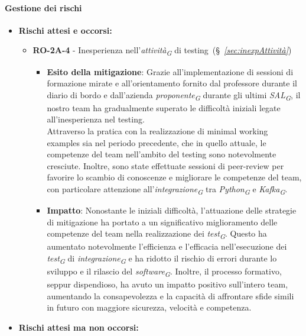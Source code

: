 \paragraph{Gestione dei rischi}

\begin{itemize}
    \item \textbf{Rischi attesi e occorsi:}
    \begin{itemize}
        \item \textbf{RO-2A-4} - Inesperienza nell'\textit{attività}\textsubscript{\textit{G}} di testing~(\S~\textit{\ref{sec:inexpAttività}})
        \begin{itemize}
            \item \textbf{Esito della mitigazione}: Grazie all'implementazione di sessioni di formazione mirate e all'orientamento fornito dal professore durante il diario di bordo e dall'azienda \textit{proponente}\textsubscript{\textit{G}} durante gli ultimi \textit{SAL}\textsubscript{\textit{G}}, il nostro team ha gradualmente superato le difficoltà iniziali legate all'inesperienza nel testing. \\
            Attraverso la pratica con la realizzazione di minimal working examples sia nel periodo precedente, che in quello attuale, le competenze del team nell'ambito del testing sono notevolmente cresciute. Inoltre, sono state effettuate sessioni di peer-review per favorire lo scambio di conoscenze e migliorare le competenze del team, con particolare attenzione all'\textit{integrazione}\textsubscript{\textit{G}} tra \textit{Python}\textsubscript{\textit{G}} e \textit{Kafka}\textsubscript{\textit{G}}.
            \item \textbf{Impatto}: Nonostante le iniziali difficoltà, l'attuazione delle strategie di mitigazione ha portato a un significativo miglioramento delle competenze del team nella realizzazione dei \textit{test}\textsubscript{\textit{G}}. Questo ha aumentato notevolmente l'efficienza e l'efficacia nell'esecuzione dei \textit{test}\textsubscript{\textit{G}} di \textit{integrazione}\textsubscript{\textit{G}} e ha ridotto il rischio di errori durante lo sviluppo e il rilascio del \textit{software}\textsubscript{\textit{G}}. Inoltre, il processo formativo, seppur dispendioso, ha avuto un impatto positivo sull'intero team, aumentando la consapevolezza e la capacità di affrontare sfide simili in futuro con maggiore sicurezza, velocità e competenza.
        \end{itemize}
    \end{itemize}
\item \textbf{Rischi attesi ma non occorsi:}

\end{itemize}
